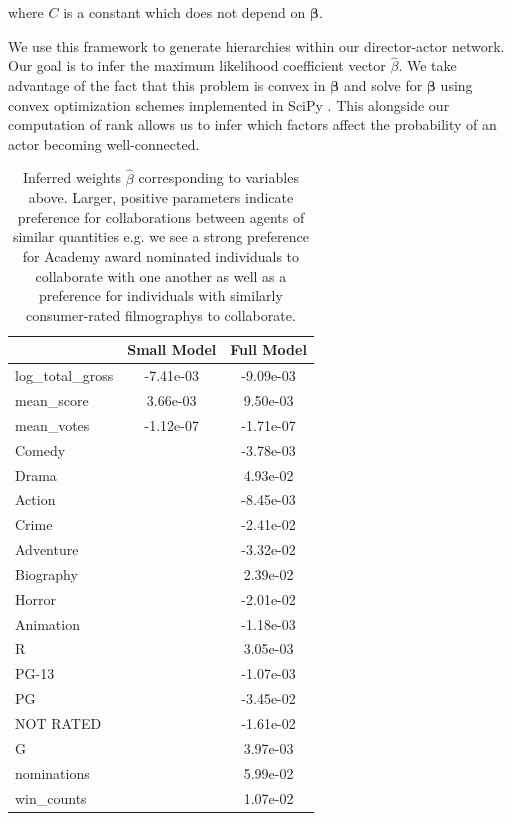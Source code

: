 \documentclass{article}
\renewcommand\vec{\mathbf}
\begin{document}
    where $C$ is a constant which does not depend on $\vec{\beta}$. 

We use this framework to generate hierarchies within our director-actor network. Our goal is to infer the maximum likelihood coefficient vector $\hat{\beta}$. We take advantage of the fact that this problem is convex in $\vec{\beta}$ and solve for $\vec{\beta}$ using convex optimization schemes implemented in SciPy \cite{SciPy2020}. This alongside our computation of rank allows us to infer which factors affect the probability of an actor becoming well-connected.

\begin{table}
\centering
\begin{tabular}{lcc}
\toprule
                 & Small Model &  Full Model \\
\midrule
 log\_total\_gross &   -7.41e-03 &   -9.09e-03 \\
      mean\_score &    3.66e-03 &    9.50e-03 \\
      mean\_votes &   -1.12e-07 &   -1.71e-07 \\
          Comedy &             &   -3.78e-03 \\
           Drama &             &    4.93e-02 \\
          Action &             &   -8.45e-03 \\
           Crime &             &   -2.41e-02 \\
       Adventure &             &   -3.32e-02 \\
       Biography &             &    2.39e-02 \\
          Horror &             &   -2.01e-02 \\
       Animation &             &   -1.18e-03 \\
               R &             &    3.05e-03 \\
           PG-13 &             &   -1.07e-03 \\
              PG &             &   -3.45e-02 \\
       NOT RATED &             &   -1.61e-02 \\
               G &             &    3.97e-03 \\
     nominations &             &    5.99e-02 \\
      win\_counts &             &    1.07e-02 \\
\bottomrule
\end{tabular}
\caption{Inferred weights $\hat{\beta}$  corresponding to variables above. Larger, positive parameters indicate preference for collaborations between agents of similar quantities e.g. we see a strong preference for Academy award nominated individuals to collaborate with one another as well as a preference for individuals with similarly consumer-rated filmographys to collaborate.}
\label{table:beta_table}
\end{table}
\end{document}
